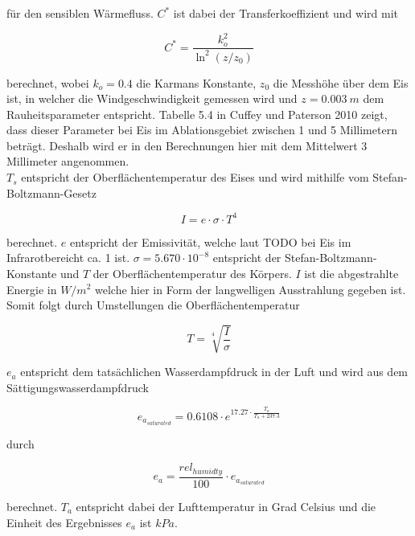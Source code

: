 \documentclass[12pt,a4paper]{article}
\begin{document}
für den sensiblen Wärmefluss. $C^*$ ist dabei der Transferkoeffizient und wird mit 

\begin{equation}
C^{*}=\frac{k_{o}^{2}}{\ln ^{2}\left(z / z_{0}\right)}
\end{equation}

berechnet, wobei $k_{o}=0.4$ die Karmans Konstante, $z_{0}$ die Messhöhe über dem Eis ist, in welcher die Windgeschwindigkeit gemessen wird und $z=0.003~m$ dem Rauheitsparameter entspricht. Tabelle 5.4 in Cuffey und Paterson 2010 zeigt, dass dieser Parameter bei Eis im Ablationsgebiet zwischen 1 und 5 Millimetern beträgt. Deshalb wird er in den Berechnungen hier mit dem Mittelwert 3 Millimeter angenommen.\\ %

$T_s$ entspricht der Oberflächentemperatur des Eises und wird mithilfe vom Stefan-Boltzmann-Gesetz 

\begin{equation}
I = e \cdot \sigma \cdot T^4
\end{equation}

berechnet. $e$ entspricht der Emissivität, welche laut TODO bei Eis im Infrarotbereicht ca. 1 ist. $\sigma=5.670 \cdot 10^{-8}$ entspricht der Stefan-Boltzmann-Konstante und $T$ der Oberflächentemperatur des Körpers. $I$ ist die abgestrahlte Energie in $W/m^2$ welche hier in Form der langwelligen Ausstrahlung gegeben ist. Somit folgt durch Umstellungen die Oberflächentemperatur

\begin{equation}\label{eq:Oberflächentemperatur}
T = \sqrt[4]{\frac{I}{\sigma}}
\end{equation}


$e_a$ entspricht dem tatsächlichen Wasserdampfdruck in der Luft und wird aus dem Sättigungswasserdampfdruck


\begin{equation}
e_{a_{saturated}}=0.6108 \cdot e^{17.27 \cdot \frac{T_a}{T_a + 237.3}}
\end{equation}

durch

\begin{equation}
e_a = \frac{rel_{humidty}}{100} \cdot e_{a_{saturated}}
\end{equation}

berechnet. $T_a$ entspricht dabei der Lufttemperatur in Grad Celsius und die Einheit des Ergebnisses $e_a$ ist $kPa$.\\
\end{document}
